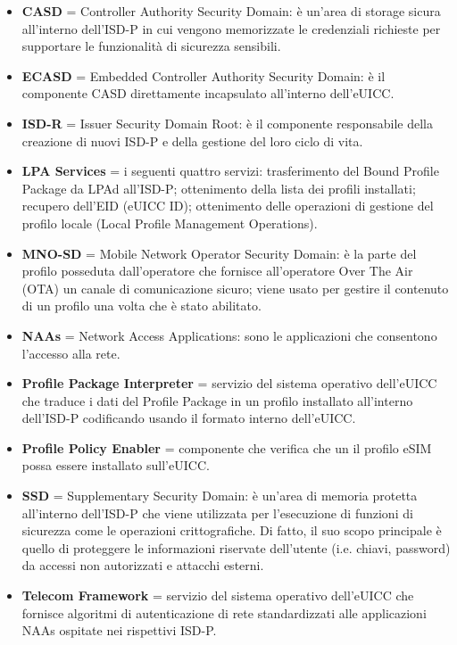 \documentclass[10pt, twoside, openany]{book}
\begin{document}
\begin{itemize}
\item \textbf{CASD} = Controller Authority Security Domain: è un'area di storage sicura all'interno dell'ISD-P in cui vengono memorizzate le credenziali richieste per supportare le funzionalità di sicurezza sensibili.
\item \textbf{ECASD} = Embedded Controller Authority Security Domain: è il componente CASD direttamente incapsulato all'interno dell'eUICC.
\item \textbf{ISD-R} = Issuer Security Domain Root: è il componente responsabile della creazione di nuovi ISD-P e della gestione del loro ciclo di vita.
\item \textbf{LPA Services} = i seguenti quattro servizi: trasferimento del Bound Profile Package da LPAd all'ISD-P; ottenimento della lista dei profili installati; recupero dell'EID (eUICC ID); ottenimento delle operazioni di gestione del profilo locale (Local Profile Management Operations).
\item \textbf{MNO-SD} = Mobile Network Operator Security Domain: è la parte del profilo posseduta dall'operatore che fornisce all'operatore Over The Air (OTA) un canale di comunicazione sicuro; viene usato per gestire il contenuto di un profilo una volta che è stato abilitato.
\item \textbf{NAAs} = Network Access Applications: sono le applicazioni che consentono l'accesso alla rete.
\item \textbf{Profile Package Interpreter} = servizio del sistema operativo dell'eUICC che traduce i dati del Profile Package in un profilo installato all'interno dell'ISD-P codificando usando il formato interno dell'eUICC.
\item \textbf{Profile Policy Enabler} = componente che verifica che un il profilo eSIM possa essere installato sull’eUICC.
\item \textbf{SSD} = Supplementary Security Domain: è un'area di memoria protetta all'interno dell'ISD-P che viene utilizzata per l'esecuzione di funzioni di sicurezza come le operazioni crittografiche. Di fatto, il suo scopo principale è quello di proteggere le informazioni riservate dell'utente (i.e. chiavi, password) da accessi non autorizzati e attacchi esterni.
\item \textbf{Telecom Framework} = servizio del sistema operativo dell'eUICC che fornisce algoritmi di autenticazione di rete standardizzati alle applicazioni NAAs ospitate nei rispettivi ISD-P.
\end{itemize}
\end{document}
